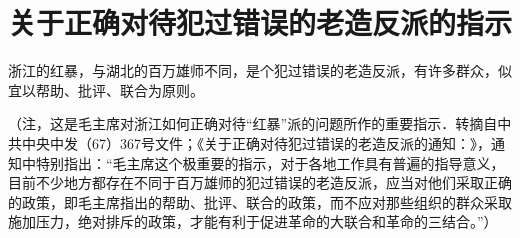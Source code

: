 \section[关于正确对待犯过错误的老造反派的指示（一九六七年十一月）]{关于正确对待犯过错误的老造反派的指示}


浙江的红暴，与湖北的百万雄师不同，是个犯过错误的老造反派，有许多群众，似宜以帮助、批评、联合为原则。

（注，这是毛主席对浙江如何正确对待“红暴”派的问题所作的重要指示．转摘自中共中央中发（67）367号文件；《关于正确对待犯过错误的老造反派的通知：》，通知中特别指出：“毛主席这个极重要的指示，对于各地工作具有普遍的指导意义，目前不少地方都存在不同于百万雄师的犯过错误的老造反派，应当对他们采取正确的政策，即毛主席指出的帮助、批评、联合的政策，而不应对那些组织的群众采取施加压力，绝对排斥的政策，才能有利于促进革命的大联合和革命的三结合。”）

